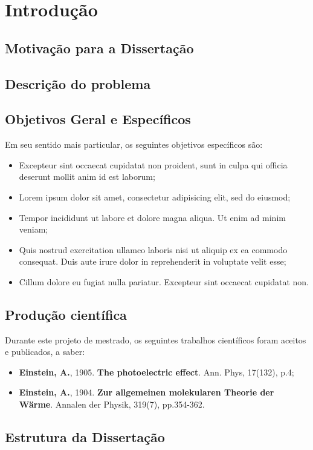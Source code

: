 \chapter{Introdução}\label{cap:introducao}
\lipsum[2-3]
\lipsum[1-4]
\lipsum[3-6]

\section{Motivação para a Dissertação}\label{sec:motivacao}
\lipsum[5-6]
\lipsum[1-2]
\lipsum[3-4]

\section{Descrição do problema}\label{sec:descricao-problema}
\lipsum[3-4]
\lipsum[1-2]
\lipsum[3-4]
\lipsum[1-2]

\section{Objetivos Geral e Específicos}\label{sec:objetivos}
\lipsum[1]

Em seu sentido mais particular, os seguintes objetivos específicos são:

\begin{itemize}
	\item Excepteur sint occaecat cupidatat non proident, sunt in culpa qui officia deserunt mollit anim id est laborum;
	\item Lorem ipsum dolor sit amet, consectetur adipisicing elit, sed do eiusmod;
	\item Tempor incididunt ut labore et dolore magna aliqua. Ut enim ad minim veniam;
	\item Quis nostrud exercitation ullamco laboris nisi ut aliquip ex ea commodo consequat. Duis aute irure dolor in reprehenderit in voluptate velit esse;
	\item Cillum dolore eu fugiat nulla pariatur. Excepteur sint occaecat cupidatat non.
\end{itemize}

\section{Produção científica}\label{sec:producao}
Durante este projeto de mestrado, os seguintes trabalhos científicos foram aceitos e publicados, a saber:

\begin{itemize}
	\item \textbf{Einstein, A.}, 1905. \textbf{The photoelectric effect}. Ann. Phys, 17(132), p.4;
	\item \textbf{Einstein, A.}, 1904. \textbf{Zur allgemeinen molekularen Theorie der Wärme}. Annalen der Physik, 319(7), pp.354-362.
\end{itemize}

\section{Estrutura da Dissertação}\label{sec:estrutura}
\lipsum[4-5]
\lipsum[1-2]
\lipsum[1-4]
\lipsum[3-2]